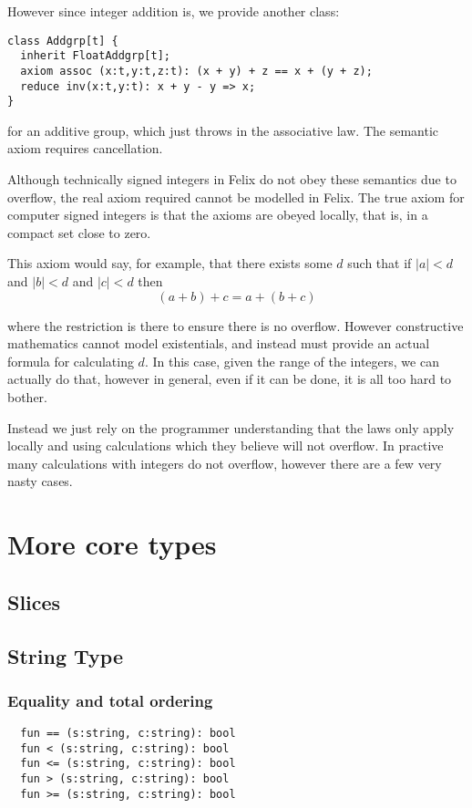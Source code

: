 \documentclass[oneside]{book}
\begin{document}
{However since integer addition is, we provide another class:

\begin{verbatim}
class Addgrp[t] {
  inherit FloatAddgrp[t];
  axiom assoc (x:t,y:t,z:t): (x + y) + z == x + (y + z);
  reduce inv(x:t,y:t): x + y - y => x;
}
\end{verbatim}

for an additive group, which just throws in the associative law.
The semantic axiom requires cancellation.

Although technically signed integers in Felix do not obey these
semantics due to overflow, the real axiom required cannot be
modelled in Felix. The true axiom for computer signed integers
is that the axioms are obeyed locally, that is, in a compact
set close to zero.

This axiom would say, for example, that there exists some $d$
such that if $|a|<d$ and $|b|<d$ and $|c|<d$ then 
$$(a + b) + c = a + (b + c)$$

where the restriction is there to ensure there is no overflow.
However constructive mathematics cannot model existentials,
and instead must provide an actual formula for calculating $d$.
In this case, given the range of the integers, we can actually
do that, however in general, even if it can be done, it is all
too hard to bother.

Instead we just rely on the programmer understanding that
the laws only apply locally and using calculations which they
believe will not overflow. In practive many calculations
with integers do not overflow, however there are a few very
nasty cases.

\chapter{More core types}
\section{Slices}

\section{String Type}
\subsection{Equality and total ordering}
\begin{verbatim}
  fun == (s:string, c:string): bool
  fun < (s:string, c:string): bool
  fun <= (s:string, c:string): bool
  fun > (s:string, c:string): bool
  fun >= (s:string, c:string): bool
\end{verbatim}

}
\end{document}
